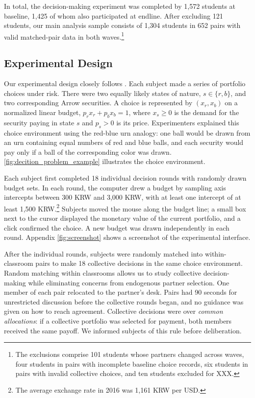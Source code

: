 \documentclass[11 pt]{article}
\begin{document}
In total, the decision-making experiment was completed by 1,572 students at baseline, 1,425 of whom also participated at endline. After excluding 121 students, our main analysis sample consists of 1,304 students in 652 pairs with valid matched-pair data in both waves.\footnote{The exclusions comprise 101 students whose partners changed across waves, four students in pairs with incomplete baseline choice records, six students in pairs with invalid collective choices, and ten students excluded for XXX.}



\subsection{Experimental Design}
\label{subsec:design}

Our experimental design closely follows \citet{Choietal:2007:AER}. Each subject made a series of portfolio choices under risk. There were two equally likely states of nature, $s \in \{r, b\}$, and two corresponding Arrow securities. A choice is represented by $(x_r, x_b)$ on a normalized linear budget, $p_r x_r + p_b x_b = 1$, where $x_s \geq 0$ is the demand for the security paying in state $s$ and $p_s > 0$ is its price. Experimenters explained this choice environment using the red-blue urn analogy: one ball would be drawn from an urn containing equal numbers of red and blue balls, and each security would pay only if a ball of the corresponding color was drawn. \autoref{fig:decition_problem_example} illustrates the choice environment.

Each subject first completed 18 individual decision rounds with randomly drawn budget sets. In each round, the computer drew a budget by sampling axis intercepts between 300 KRW and 3,000 KRW, with at least one intercept of at least 1,500 KRW.\footnote{The average exchange rate in 2016 was 1,161 KRW per USD.} Subjects moved the mouse along the budget line; a small box next to the cursor displayed the monetary value of the current portfolio, and a click confirmed the choice. A new budget was drawn independently in each round. Appendix \autoref{fig:screenshot} shows a screenshot of the experimental interface.

After the individual rounds, subjects were randomly matched into within-classroom pairs to make 18 collective decisions in the same choice environment. Random matching within classrooms allows us to study collective decision-making while eliminating concerns from endogenous partner selection. One member of each pair relocated to the partner's desk. Pairs had 90 seconds for unrestricted discussion before the collective rounds began, and no guidance was given on how to reach agreement. Collective decisions were over \textit{common allocations}: if a collective portfolio was selected for payment, both members received the same payoff. We informed subjects of this rule before deliberation.
\end{document}
